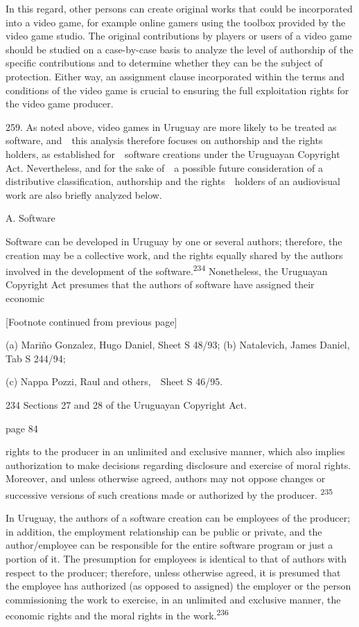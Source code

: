 \documentclass[
]{article}
\begin{document}
{In this regard, other persons can create original works that could be
incorporated into a video game, for example online gamers using the
toolbox provided by the video game studio. The original contributions by
players or users of a video game should be studied on a case-by-case
basis to analyze the level of authorship of the specific contributions
and to determine whether they can be the subject of protection. Either
way, an assignment clause incorporated within the terms and conditions
of the video game is crucial to ensuring the full exploitation rights
for the video game producer.}

{259. }{As noted above, video games in Uruguay are more likely to be
treated as software, and~~this analysis therefore focuses on authorship
and the rights holders, as established for~~software creations under the
Uruguayan }{Copyright Act}{. Nevertheless, and for the sake of~~a
possible future consideration of a distributive classification,
authorship and the rights~~holders of an audiovisual work are also
briefly analyzed below.}

{A. Software}

{Software can be developed in Uruguay by one or several authors;
therefore, the creation may be a collective work, and the rights equally
shared by the authors involved in the development of the
software.}\textsuperscript{{234 }}{Nonetheless, the Uruguayan
}{Copyright Act }{presumes that the authors of software have assigned
their economic}

{{[}Footnote continued from previous page{]}}

{(a) Mariño Gonzalez, Hugo Daniel, Sheet S 48/93; (b) Natalevich, James
Daniel, Tab S 244/94;}

{(c) Nappa Pozzi, Raul and others,~~Sheet S 46/95.}

{234 }{Sections 27 and 28 of the Uruguayan }{Copyright Act}{.}

{page 84}

{rights to the producer in an unlimited and exclusive manner, which also
implies authorization to make decisions regarding disclosure and
exercise of moral rights. Moreover, and unless otherwise agreed, authors
may not oppose changes or successive versions of such creations made or
authorized by the producer. }\textsuperscript{{235}}

{In Uruguay, the authors of a software creation can be employees of the
producer; in addition, the employment relationship can be public or
private, and the author/employee can be responsible for the entire
software program or just a portion of it. The presumption for employees
is identical to that of authors with respect to the producer; therefore,
unless otherwise agreed, it is presumed that the employee has
}{authorized }{(as opposed to assigned) the employer or the person
commissioning the work to exercise, in an unlimited and exclusive
manner, the economic rights and the moral rights in the
work.}\textsuperscript{{236}}
\end{document}
